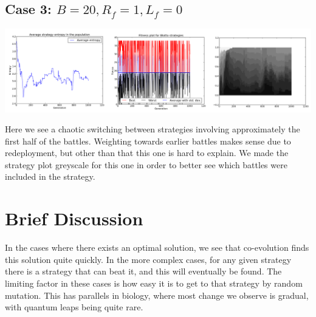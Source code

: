 \documentclass[a4paper,12pt]{article}
\begin{document}
\subsection{Case 3: $B=20, R_{f}=1, L_{f}=0$}
\centerline{\includegraphics[width=1.2\textwidth]{case3}}
Here we see a chaotic switching between strategies involving approximately the first half of the battles. Weighting towards earlier battles makes sense due to redeployment, but other than that this one is hard to explain. We made the strategy plot greyscale for this one in order to better see which battles were included in the strategy.

\section{Brief Discussion}
In the cases where there exists an optimal solution, we see that co-evolution finds this solution quite quickly. In the more complex cases, for any given strategy there is a strategy that can beat it, and this will eventually be found. The limiting factor in these cases is how easy it is to get to that strategy by random mutation. This has parallels in biology, where most change we observe is gradual, with quantum leaps being quite rare.
\end{document}
